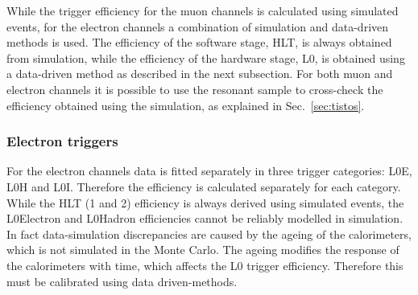 While the trigger efficiency for the muon channels is calculated using simulated events,
for the electron channels a combination of simulation and data-driven methods is used.
The efficiency of the software stage, HLT, is always obtained from simulation,
while the efficiency of the hardware stage, L0, is obtained using a data-driven method
as described in the next subsection.
For both muon and electron channels it is possible to use the resonant sample to cross-check
the efficiency obtained using the simulation, as explained in Sec.~\ref{sec:tistos}.

\subsubsection{Electron triggers}
\label{sec:RKst_trigee}

For the electron channels data is fitted separately in three trigger categories: L0E, L0H and L0I.
Therefore the efficiency is calculated separately for each category.
While the HLT (1 and 2) efficiency is always derived using simulated events,
the L0Electron and L0Hadron efficiencies cannot be reliably modelled in simulation.
In fact data-simulation discrepancies are caused by the ageing of the 
calorimeters, which is not simulated in the Monte Carlo. The ageing modifies the response
of the calorimeters with time, which affects the L0 trigger efficiency.
Therefore this must be calibrated using data driven-methods.

